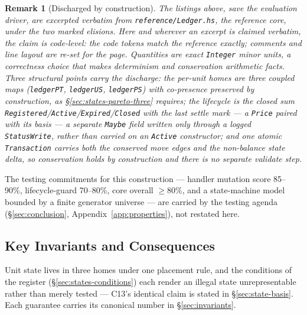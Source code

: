 \documentclass[11pt,a4paper]{article}
\newtheorem{remark}[definition]{Remark}
\begin{document}
\begin{remark}[Discharged by construction]
The listings above, save the evaluation driver, are excerpted verbatim from
\texttt{reference/\allowbreak Ledger.hs}, the reference core, under the two marked
elisions. Here and wherever an excerpt is claimed verbatim, the claim is code-level:
the code tokens match the reference exactly; comments and line layout are re-set for
the page.
Quantities are exact \texttt{Integer} minor units, a correctness choice that makes
determinism and conservation arithmetic facts. Three structural points carry the
discharge: the per-unit homes are \emph{three coupled maps} (\texttt{ledgerPT}, \texttt{ledgerUS},
\texttt{ledgerPS}) with co-presence preserved by construction, as
\S\ref{sec:states-pareto-three} requires; the lifecycle is the closed sum
\texttt{Registered}/\texttt{Active}/\texttt{Expired}/\texttt{Closed} with the last settle
mark --- a \texttt{Price} paired with its basis --- a separate \texttt{Maybe} field written
only through a logged \texttt{StatusWrite}, rather than carried on an \texttt{Active}
constructor; and one atomic \texttt{Transaction}
carries both the conserved move edges and the non-balance state delta, so conservation holds
by construction and there is no separate validate step.
\end{remark}

The testing commitments for this construction --- handler mutation score 85--90\%,
lifecycle-guard 70--80\%, core overall $\geq80\%$, and a state-machine model bounded by a
finite generator universe --- are carried by the testing agenda
(\S\ref{sec:conclusion}, Appendix~\ref{app:properties}), not restated here.

\subsection*{Key Invariants and Consequences}

Unit state lives in three homes under one placement rule, and the conditions of the
register (\S\ref{sec:states-conditions}) each render an illegal state unrepresentable
rather than merely tested --- C13's identical claim is stated in \S\ref{sec:state-basis}.
Each guarantee carries its canonical number in \S\ref{sec:invariants}.
\end{document}
